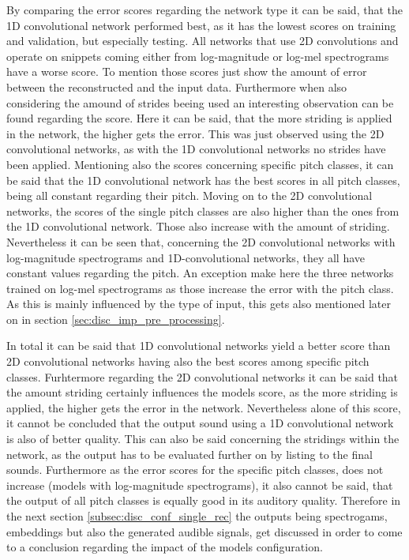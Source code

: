 By comparing the error scores regarding the network type it can be said, that the 1D convolutional network performed best, as it has the lowest scores on training and validation, but especially testing. All networks that use 2D convolutions and operate on snippets coming either from log-magnitude or log-mel spectrograms have a worse score. To mention those scores just show the amount of error between the reconstructed and the input data. Furthermore when also considering the amound of strides beeing used an interesting observation can be found regarding the score. Here it can be said, that the more striding is applied in the network, the higher gets the error. This was just observed using the 2D convolutional networks, as with the 1D convolutional networks no strides have been applied. Mentioning also the scores concerning specific pitch classes, it can be said that the 1D convolutional network has the best scores in all pitch classes, being all constant regarding their pitch. Moving on to the 2D convolutional networks, the scores of the single pitch classes are also higher than the ones from the 1D convolutional network. Those also increase with the amount of striding. Nevertheless it can be seen that, concerning the 2D convolutional networks with log-magnitude spectrograms and 1D-convolutional networks, they all have constant values regarding the pitch. An exception make here the three networks trained on log-mel spectrograms as those increase the error with the pitch class. As this is mainly influenced by the type of input, this gets also mentioned later on in section \ref{sec:disc_imp_pre_processing}. 

In total it can be said that 1D convolutional networks yield a better score than 2D convolutional networks having also the best scores among specific pitch classes. Furhtermore regarding the 2D convolutional networks it can be said that the amount striding certainly influences the models score, as the more striding is applied, the higher gets the error in the network. Nevertheless alone of this score, it cannot be concluded that the output sound using a 1D convolutional network is also of better quality. This can also be said concerning the stridings within the network, as the output has to be evaluated further on by listing to the final sounds. Furthermore as the error scores for the specific pitch classes, does not increase (models with log-magnitude spectrograms), it also cannot be said, that the output of all pitch classes is equally good in its auditory quality. Therefore in the next section \ref{subsec:disc_conf_single_rec} the outputs being spectrogams, embeddings but also the generated audible signals, get discussed in order to come to a conclusion regarding the impact of the models configuration.

